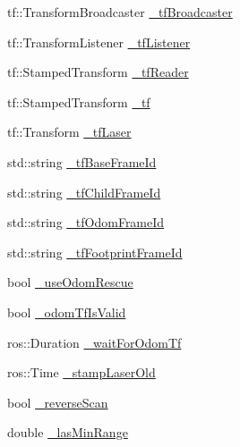 \begin{DoxyCompactItemize}
\item 
tf\-::\-Transform\-Broadcaster \hyperlink{classohm__tsd__slam__ref_1_1ThreadLocalize_a422982c64baaa0ea6b2e259c78bb14f8}{\-\_\-tf\-Broadcaster}
\item 
tf\-::\-Transform\-Listener \hyperlink{classohm__tsd__slam__ref_1_1ThreadLocalize_a224fab0e74f4e79a3bd7477c7ba67927}{\-\_\-tf\-Listener}
\item 
tf\-::\-Stamped\-Transform \hyperlink{classohm__tsd__slam__ref_1_1ThreadLocalize_ad6eb4ec2cbb72976a751195aaa87b230}{\-\_\-tf\-Reader}
\item 
tf\-::\-Stamped\-Transform \hyperlink{classohm__tsd__slam__ref_1_1ThreadLocalize_a58c3e63ca51b4f667361138ca9612a43}{\-\_\-tf}
\item 
tf\-::\-Transform \hyperlink{classohm__tsd__slam__ref_1_1ThreadLocalize_a865325fdc2badfde0512622d52d60f46}{\-\_\-tf\-Laser}
\item 
std\-::string \hyperlink{classohm__tsd__slam__ref_1_1ThreadLocalize_ab83a495abfe38788855cd283334052ee}{\-\_\-tf\-Base\-Frame\-Id}
\item 
std\-::string \hyperlink{classohm__tsd__slam__ref_1_1ThreadLocalize_a15312866770a11e59f0e2e260a5d8c05}{\-\_\-tf\-Child\-Frame\-Id}
\item 
std\-::string \hyperlink{classohm__tsd__slam__ref_1_1ThreadLocalize_a4f3c79f1893a406885983bd8984954e2}{\-\_\-tf\-Odom\-Frame\-Id}
\item 
std\-::string \hyperlink{classohm__tsd__slam__ref_1_1ThreadLocalize_a49f36ec368f39a906125435adb7fa231}{\-\_\-tf\-Footprint\-Frame\-Id}
\item 
bool \hyperlink{classohm__tsd__slam__ref_1_1ThreadLocalize_a50a25580c50a3b14d04a548416142d6c}{\-\_\-use\-Odom\-Rescue}
\item 
bool \hyperlink{classohm__tsd__slam__ref_1_1ThreadLocalize_a60894678d5815e42124c78eef219cf8b}{\-\_\-odom\-Tf\-Is\-Valid}
\item 
ros\-::\-Duration \hyperlink{classohm__tsd__slam__ref_1_1ThreadLocalize_a5f43425ab2bb540e72205ef83e37d4ff}{\-\_\-wait\-For\-Odom\-Tf}
\item 
ros\-::\-Time \hyperlink{classohm__tsd__slam__ref_1_1ThreadLocalize_a3993fb6424dd9af667ddf0b14cdf2fe4}{\-\_\-stamp\-Laser\-Old}
\item 
bool \hyperlink{classohm__tsd__slam__ref_1_1ThreadLocalize_a176899f67fbf706a756853a8af968fd5}{\-\_\-reverse\-Scan}
\item 
double \hyperlink{classohm__tsd__slam__ref_1_1ThreadLocalize_a6170ca0dd6108536689c4dab3f7425f6}{\-\_\-las\-Min\-Range}
\end{DoxyCompactItemize}
